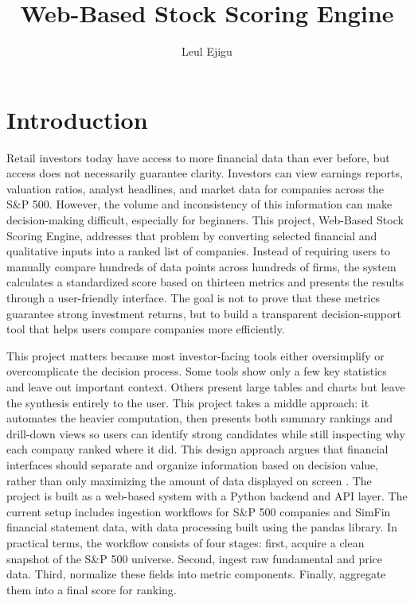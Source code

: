 \documentclass[12pt]{article}
\title{\textbf{Web-Based Stock Scoring Engine}}
\author{Leul Ejigu }
\begin{document}
\maketitle

\section{Introduction}
Retail investors today have access to more financial data than ever before, but access does not necessarily guarantee clarity. Investors can view earnings reports, valuation ratios, analyst headlines, and market data for companies across the S\&P 500. However, the volume and inconsistency of this information can make decision-making difficult, especially for beginners. This project, Web-Based Stock Scoring Engine, addresses that problem by converting selected financial and qualitative inputs into a ranked list of companies. Instead of requiring users to manually compare hundreds of data points across hundreds of firms, the system calculates a standardized score based on thirteen metrics and presents the results through a user-friendly interface. The goal is not to prove that these metrics guarantee strong investment returns, but to build a transparent decision-support tool that helps users compare companies more efficiently.

This project matters because most investor-facing tools either oversimplify or overcomplicate the decision process. Some tools show only a few key statistics and leave out important context. Others present large tables and charts but leave the synthesis entirely to the user. This project takes a middle approach: it automates the heavier computation, then presents both summary rankings and drill-down views so users can identify strong candidates while still inspecting why each company ranked where it did. This design approach argues that financial interfaces should separate and organize information based on decision value, rather than only maximizing the amount of data displayed on screen \cite{Ettredge2001WebDesign}.
The project is built as a web-based system with a Python backend and API layer. The current setup includes ingestion workflows for S\&P 500 companies and SimFin financial statement data, with data processing built using the pandas library. In practical terms, the workflow consists of four stages: first, acquire a clean snapshot of the S\&P 500 universe. Second, ingest raw fundamental and price data. Third, normalize these fields into metric components. Finally, aggregate them into a final score for ranking. 
\end{document}
